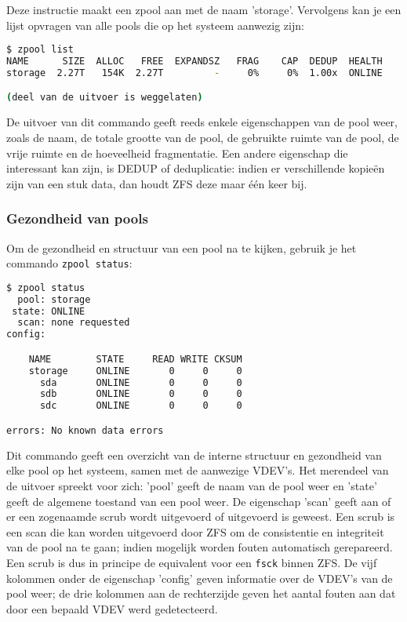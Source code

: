 \clearpage

Deze instructie maakt een zpool aan met de naam 'storage'. Vervolgens kan je een lijst opvragen van alle pools die op het systeem aanwezig zijn:

\begin{lstlisting}[language=bash,style=command_style]
$ zpool list
NAME      SIZE  ALLOC   FREE  EXPANDSZ   FRAG    CAP  DEDUP  HEALTH 
storage  2.27T   154K  2.27T         -     0%     0%  1.00x  ONLINE 

(deel van de uitvoer is weggelaten)

\end{lstlisting}

De uitvoer van dit commando geeft reeds enkele eigenschappen van de pool weer, zoals de naam, de totale grootte van de pool, de gebruikte ruimte van de pool, de vrije ruimte en de hoeveelheid fragmentatie. Een andere eigenschap die interessant kan zijn, is DEDUP of deduplicatie: indien er verschillende kopieën zijn van een stuk data, dan houdt ZFS deze maar één keer bij. 

\subsubsection{Gezondheid van pools}

Om de gezondheid en structuur van een pool na te kijken, gebruik je het commando \texttt{zpool status}:

\begin{lstlisting}[language=bash,style=command_style]
$ zpool status
  pool: storage
 state: ONLINE
  scan: none requested
config:

	NAME        STATE     READ WRITE CKSUM
	storage     ONLINE       0     0     0
	  sda       ONLINE       0     0     0
	  sdb       ONLINE       0     0     0
	  sdc       ONLINE       0     0     0

errors: No known data errors
\end{lstlisting}

Dit commando geeft een overzicht van de interne structuur en gezondheid van elke pool op het systeem, samen met de aanwezige VDEV's. Het merendeel van de uitvoer spreekt voor zich: 'pool' geeft de naam van de pool weer en 'state' geeft de algemene toestand van een pool weer. De eigenschap 'scan' geeft aan of er een zogenaamde scrub wordt uitgevoerd of uitgevoerd is geweest. Een scrub is een scan die kan worden uitgevoerd door ZFS om de consistentie en integriteit van de pool na te gaan; indien mogelijk worden fouten automatisch gerepareerd. Een scrub is dus in principe de equivalent voor een \texttt{\gls{fsck}} binnen ZFS. De vijf kolommen onder de eigenschap 'config' geven informatie over de VDEV's van de pool weer; de drie kolommen aan de rechterzijde geven het aantal fouten aan dat door een bepaald VDEV werd gedetecteerd.

